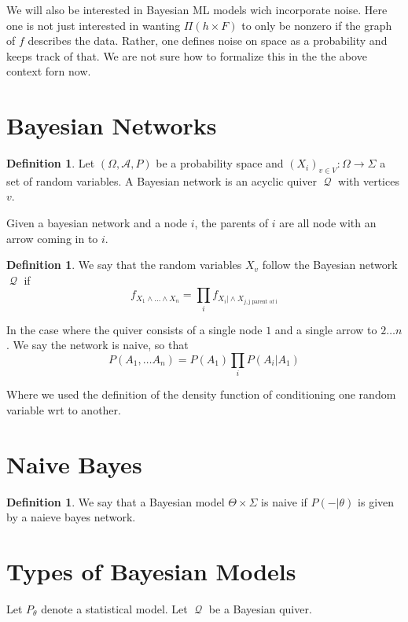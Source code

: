 \documentclass{book}
\theoremstyle{plain}
\theoremstyle{definition}
\newtheorem{definition}[corollary]{Definition}
\newcommand{\mor}{\longrightarrow}
\renewcommand{\r}[1]{\mathcal{#1}}
\DeclareMathOperator{\Qvr}{\mathcal{Q}}
\begin{document}
We will also be interested in Bayesian ML models wich incorporate noise. Here one is not just interested in wanting $\Pi(h\times F)$ to only be nonzero if the graph of $f$ describes the data. Rather, one defines noise on space as a probability and keeps track of that. We are not sure how to formalize this in the the above context forn now.

\section{Bayesian Networks}

\begin{definition}
Let $(\Omega,\r{A},P)$ be a probability space and $(X_i)_{v \in V}: \Omega\mor \Sigma$ a set of random variables.
A Bayesian network is an acyclic	 quiver  $\Qvr$ with vertices $v$.\\
\end{definition}
Given a bayesian network and a node $i$, the parents of $i$ are all node with an arrow coming in to $i$.

\begin{definition}
We say that the random variables $X_v$ follow the Bayesian network $\Qvr$ if
\[
f_{X_1\wedge \ldots \wedge X_n}=\prod_i f_{X_i \vert \wedge X_{j, \textrm{j parent of i}}}\]
\end{definition}
In the case where the quiver consists of a single node $1$ and a single arrow to $2\ldots n$. We say the network is naive, so that
\[
P(A_1,\ldots A_n)=P(A_1)\prod_i P(A_i\vert A_1)
\]

Where we used the definition of the density function of conditioning one random variable wrt to another.
\section{Naive Bayes}

\begin{definition}
We say that a Bayesian model $\Theta \times \Sigma$ 	is naive if $P(-\vert \theta)$ is given by a naieve bayes network.
\end{definition}



\section{Types of Bayesian Models}

Let $P_\theta$ denote a statistical model. Let $\Qvr$ be a Bayesian quiver.
\end{document}
